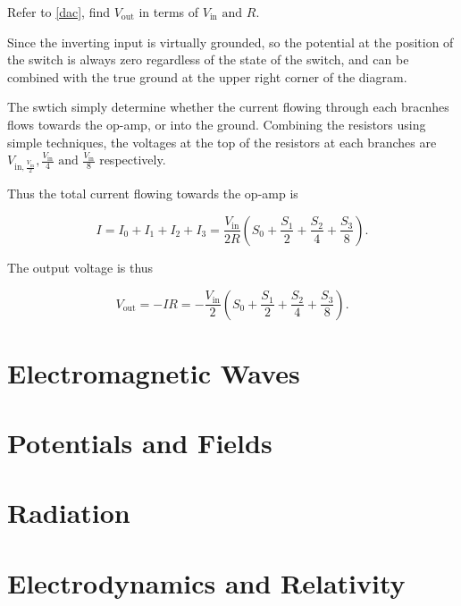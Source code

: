 \documentclass[english,a4paper,12pt]{report}
\begin{document}
{Refer to \cref{dac}, find \(V_{\text{out} } \) in terms of \(V_{\text{in} }\text { and } R \).  }
{Since the inverting input is virtually grounded, so the potential at the position of the switch is always zero regardless of the state of the switch, and can be combined with the true ground at the upper right corner of the diagram.

The swtich simply determine whether the current flowing through each bracnhes flows towards the op-amp, or into the ground. Combining the resistors using simple techniques, the voltages at the top of the resistors at each branches are \(V_{\text{in}, \frac{V_{\text{in} } }{2} }, \frac{V_{\text{in} } }{4}  \text { and } \frac{V_{\text{in} } }{8}  \) respectively. 

Thus the total current flowing towards the op-amp is

\begin{equation}
    I = I_0 + I_1 + I_2 + I_3 = \frac{V_{\text{in} } }{2R}\left( S_0 + \frac{S_1}{2} + \frac{S_2 }{4} + \frac{S_3}{8} \right). 
\end{equation}

The output voltage is thus 

\begin{equation}
    V_{\text{out} } = - IR =  - \frac{V_{\text{in} } }{2}\left( S_0 + \frac{S_1}{2} + \frac{S_2 }{4} + \frac{S_3}{8} \right).
\end{equation}


} 


\chapter{Electromagnetic Waves}

\chapter{Potentials and Fields}


\chapter{Radiation}

\chapter{Electrodynamics and Relativity}
\end{document}

